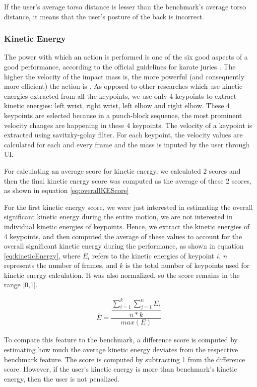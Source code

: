 If the user's average torso distance is lesser than the benchmark's average torso distance, it means that the user's posture of the back is incorrect. 

\subsubsection{Kinetic Energy}

The power with which an action is performed is one of the six good aspects of a good performance, according to the official guidelines for karate juries \cite{movementQuality}. The higher the velocity of the impact mass is, the more powerful (and consequently more efficient) the action is \cite{movementQuality}. As opposed to other researches which use kinetic energies extracted from all the keypoints, we use only 4 keypoints to extract kinetic energies: left wrist, right wrist, left elbow and right elbow. These 4 keypoints are selected because in a punch-block sequence, the most prominent velocity changes are happening in these 4 keypoints. The velocity of a keypoint is extracted using savitzky-golay filter. For each keypoint, the velocity values are calculated for each and every frame and the mass is inputed by the user through UI. 

For calculating an average score for kinetic energy, we calculated 2 scores and then the final kinetic energy score was computed as the average of these 2 scores, as shown in equation \ref{eq:overallKEScore}

For the first kinetic energy score, we were just interested in estimating the overall significant kinetic energy during the entire motion, we are not interested in individual kinetic energies of keypoints. Hence, we extract the kinetic energies of 4 keypoints, and then computed the average of these values to account for the overall significant kinetic energy during the performance, as shown in equation \ref{eq:kineticEnergy}, where $E_i$ refers to the kinetic energies of keypoint $i$, $n$ represents the number of frames, and $k$ is the total number of keypoints used for kinetic energy calculation. It was also normalized, so the score remains in the range [0,1].

\begin{gather}
  \overline{E} = \dfrac{\dfrac{\sum_{i=1}^k \sum_{j=1}^n E_i}{n * k}}{max(E)} 
  \label{eq:kineticEnergy}
\end{gather}

To compare this feature to the benchmark, a difference score is computed by estimating how much the average kinetic energy deviates from the respective benchmark feature. The score is computed by subtracting 1 from the difference score. However, if the user's kinetic energy is more than benchmark's kinetic energy, then the user is not penalized. 

